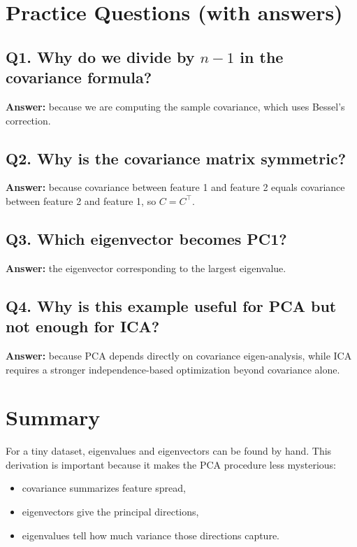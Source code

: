 \documentclass[11pt]{article}
\begin{document}
\section{Practice Questions (with answers)}
\subsection*{Q1. Why do we divide by $n-1$ in the covariance formula?}
\textbf{Answer:} because we are computing the sample covariance, which uses Bessel's correction.

\subsection*{Q2. Why is the covariance matrix symmetric?}
\textbf{Answer:} because covariance between feature 1 and feature 2 equals covariance between feature 2 and feature 1, so $C = C^\top$.

\subsection*{Q3. Which eigenvector becomes PC1?}
\textbf{Answer:} the eigenvector corresponding to the largest eigenvalue.

\subsection*{Q4. Why is this example useful for PCA but not enough for ICA?}
\textbf{Answer:} because PCA depends directly on covariance eigen-analysis, while ICA requires a stronger independence-based optimization beyond covariance alone.

\section{Summary}
For a tiny dataset, eigenvalues and eigenvectors can be found by hand.
This derivation is important because it makes the PCA procedure less mysterious:
\begin{itemize}[leftmargin=*]
  \item covariance summarizes feature spread,
  \item eigenvectors give the principal directions,
  \item eigenvalues tell how much variance those directions capture.
\end{itemize}
\notesources{\AIMLMiscSources}
\end{document}
